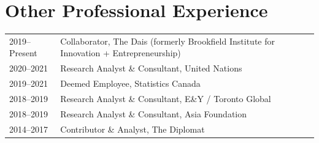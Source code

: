 \documentclass[11pt, a4paper]{article}
\begin{document}
\section{Other Professional Experience}

\noindent\begin{tabularx}{\textwidth}{@{}p{2.4cm}X@{}}
  2019--Present & Collaborator, The Dais (formerly Brookfield Institute for Innovation + Entrepreneurship) \\[0.15em]
  2020--2021 & Research Analyst \& Consultant, United Nations \\[0.15em]
  2019--2021 & Deemed Employee, Statistics Canada \\[0.15em]
  2018--2019 & Research Analyst \& Consultant, E\&Y / Toronto Global \\[0.15em]
  2018--2019 & Research Analyst \& Consultant, Asia Foundation \\[0.15em]
  2014--2017 & Contributor \& Analyst, The Diplomat
\end{tabularx}
\end{document}
